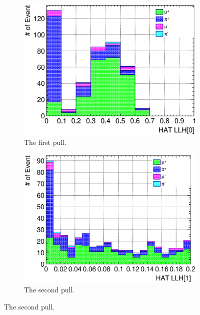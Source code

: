           \begin{figure}
               \centering
               \begin{subfigure}{\dbfigwid\textwidth}
                    \includegraphics[width=\textwidth]{figures/sel/sspi_TOP_hat_pid0_stack_al5.eps}
                    \caption{The first pull.}
                    \label{subfig:sppi-pulls-1}
               \end{subfigure}
               \begin{subfigure}{\dbfigwid\textwidth}
                    \includegraphics[width=\textwidth]{figures/sel/sspi_TOP_hat_pid1_stack_al5.eps}
                    \caption{The second pull.}
                    \label{subfig:sppi-pulls-2}

\end{subfigure}
\end{figure}
